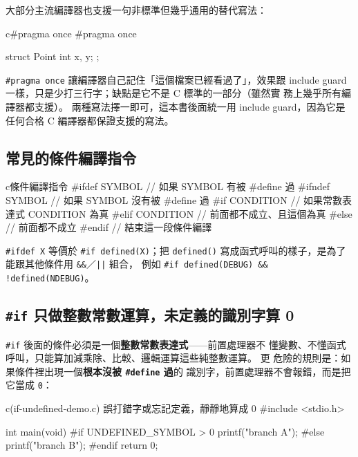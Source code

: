 大部分主流編譯器也支援一句非標準但幾乎通用的替代寫法：

\begin{code}{c}{\#pragma once}
#pragma once

struct Point { int x, y; };
\end{code}

\texttt{\#pragma once} 讓編譯器自己記住「這個檔案已經看過了」，效果跟
include guard 一樣，只是少打三行字；缺點是它不是 C 標準的一部分（雖然實
務上幾乎所有編譯器都支援）。 兩種寫法擇一即可，這本書後面統一用 include
guard，因為它是任何合格 C 編譯器都保證支援的寫法。


\subsection{常見的條件編譯指令}

\begin{code}{c}{條件編譯指令}
#ifdef SYMBOL      // 如果 SYMBOL 有被 #define 過
#ifndef SYMBOL     // 如果 SYMBOL 沒有被 #define 過
#if CONDITION      // 如果常數表達式 CONDITION 為真
#elif CONDITION    // 前面都不成立、且這個為真
#else              // 前面都不成立
#endif             // 結束這一段條件編譯
\end{code}

\texttt{\#ifdef X} 等價於 \texttt{\#if defined(X)}；把 \texttt{defined()}
寫成函式呼叫的樣子，是為了能跟其他條件用 \texttt{\&\&}／\texttt{||} 組合，
例如 \texttt{\#if defined(DEBUG) \&\& !defined(NDEBUG)}。

\subsection[\#if 只算整數常數]{\texttt{\#if} 只做整數常數運算，未定義的識別字算 0}

\texttt{\#if} 後面的條件必須是一個\textbf{整數常數表達式}——前置處理器不
懂變數、不懂函式呼叫，只能算加減乘除、比較、邏輯運算這些純整數運算。 更
危險的規則是：如果條件裡出現一個\textbf{根本沒被 \texttt{\#define} 過}的
識別字，前置處理器不會報錯，而是把它當成 \texttt{0}：

\begin{example}{c}{(if-undefined-demo.c) 誤打錯字或忘記定義，靜靜地算成 0}
#include <stdio.h>

int main(void) {
#if UNDEFINED_SYMBOL > 0
    printf("branch A\n");
#else
    printf("branch B\n");
#endif
    return 0;
}
\end{example}

